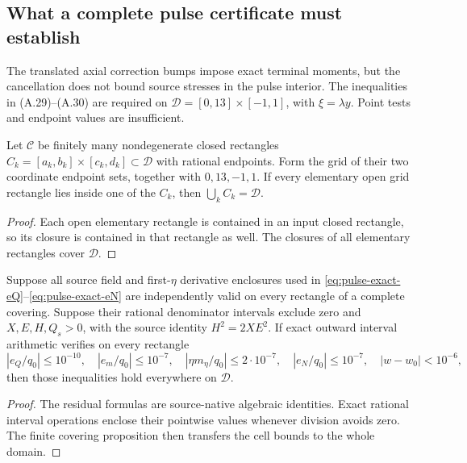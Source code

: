 \subsection*{What a complete pulse certificate must establish}
The translated axial correction bumps impose exact terminal moments, but
the cancellation does not bound source stresses in the pulse interior.
The inequalities in (A.29)--(A.30) are required on
$\mathcal D=[0,13]\times[-1,1]$, with $\xi=\lambda y$.
Point tests and endpoint values are insufficient.

\begin{proposition}
\label{prop:full-pulse-cover}
Let $\mathcal C$ be finitely many nondegenerate closed rectangles
$C_k=[a_k,b_k]\times[c_k,d_k]\subset\mathcal D$ with rational
endpoints. Form the grid of their two coordinate endpoint sets,
together with $0,13,-1,1$. If every elementary open grid rectangle
lies inside one of the $C_k$, then $\bigcup_k C_k=\mathcal D$.
\end{proposition}
\begin{proof}
Each open elementary rectangle is contained in an input closed
rectangle, so its closure is contained in that rectangle as well.
The closures of all elementary rectangles cover $\mathcal D$.
\end{proof}

\begin{proposition}
\label{prop:full-pulse-residual-soundness}
Suppose all source field and first-$\eta$ derivative enclosures used
in \eqref{eq:pulse-exact-eQ}--\eqref{eq:pulse-exact-eN} are
independently valid on every rectangle of a complete covering.
Suppose their rational denominator intervals exclude zero and
$X,E,H,Q_s>0$, with the source identity $H^2=2XE^2$.
If exact outward interval arithmetic verifies on every rectangle
\[
|e_Q/q_0|\le10^{-10},\quad |e_m/q_0|\le10^{-7},
\quad |\eta m_\eta/q_0|\le2\cdot10^{-7},\quad
|e_N/q_0|\le10^{-7},\quad |w-w_0|<10^{-6},
\]
then those inequalities hold everywhere on $\mathcal D$.
\end{proposition}
\begin{proof}
The residual formulas are source-native algebraic identities.
Exact rational interval operations enclose their pointwise values
whenever division avoids zero. The finite covering proposition
then transfers the cell bounds to the whole domain.
\end{proof}

